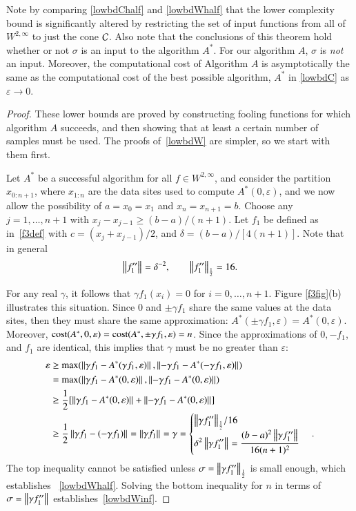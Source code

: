 \documentclass[review]{elsarticle}
\newcommand{\abstol}{\varepsilon}
\theoremstyle{definition}
\renewcommand{\cw}{W}
\begin{document}
Note by comparing \eqref{lowbdChalf} and \eqref{lowbdWhalf} that the lower complexity 
bound is significantly altered by restricting the
set of input functions from all of $ \cw^{2,\infty}$ to just the cone
$\cc$. Also note that the
conclusions of this theorem hold whether or not $\sigma$ is an input to the
algorithm $A^*$. For our algorithm $A$, $\sigma$ is \emph{not} an input. Moreover, the 
computational cost of Algorithm $A$ is asymptotically
the same as the computational cost of the best possible algorithm, $A^*$ in 
\eqref{lowbdC} as $\abstol \to 0$.

\begin{proof}
	These lower bounds are proved by constructing fooling functions for which
	algorithm $A$ succeeds, and then showing that at least a certain number of
	samples must be used. The proofs of~\eqref{lowbdW} are simpler, so
	we start with them first.
		
	Let $A^*$ be a successful algorithm for all $f \in \cw^{2,\infty}$, and consider
	the partition $x_{0:n+1}$, where $x_{1:n}$ are the data sites
	used to compute $A^*(0,\abstol)$, and we now allow the possibility of $a = x_0=x_1$ 
	and $x_n = x_{n+1} = b$. Choose any $j=1, \ldots, n+1$ with
	$x_j-x_{j-1} \ge (b-a)/(n+1)$. Let $f_1$ be defined as in~\eqref{f3def} with $c
	= (x_j+x_{j-1})/2$, and $\delta = (b-a)/[4(n+1)]$. Note that in general
	\begin{equation}
	\norm{f_1''} =  \delta^{-2}, \qquad \norm[\frac 12]{f_1''} = 16.
	\end{equation}

	For any real $\gamma$, it follows that $\gamma f_1(x_i)=0$ for $i=0, \ldots,
	n+1$. Figure \ref{f3fig}(b) illustrates this situation. Since $0$ and $\pm
	\gamma f_1$ share the same values at the data sites, then they must share the
	same approximation: $A^*(\pm \gamma f_1,\abstol) = A^*(0,\abstol)$. Moreover,
	$\cost(A^*,0,\abstol) = \cost(A^*,\pm \gamma f_1,\abstol) = n$. Since the
	approximations of $0, -f_1$, and $f_1$ are identical, this implies that $\gamma$
	must be no greater than $\abstol$:
	\begin{align*}
	\abstol  &\ge \max(\norm{\gamma f_1 - A^*(\gamma f_1,\abstol)}, 
	\norm{-\gamma f_1 - A^*(-\gamma f_1,\abstol)}) \\
	&= \max(\norm{\gamma f_1 - A^*(0,\abstol)}, \norm{-\gamma f_1 - A^*(0,\abstol)}) \\
	& \ge \frac{1}{2} [\norm{\gamma f_1 - A^*(0,\abstol)} 
	+ \norm{-\gamma f_1 - A^*(0,\abstol)}] \\
	& \ge \frac{1}{2} \norm{\gamma f_1 - (-\gamma f_1)} =  \norm{\gamma f_1} 
	= \gamma %
	= \begin{cases} \displaystyle { \norm[\frac 12]{\gamma f_1''}}/{16}  \\
	\displaystyle \delta^2 	\norm{\gamma f_1''} 
	=  \frac{(b-a)^2 \norm{\gamma f_1''}}{16(n+1)^2}
	\end{cases}.
	\end{align*}
	The top inequality cannot be satisfied unless $\sigma = \norm[\frac 12]{\gamma
	f_1''}$ is small enough, which establishes ~\eqref{lowbdWhalf}. Solving the
	bottom inequality for $n$ in terms of $\sigma = \norm{\gamma f_1''}$
	establishes~\eqref{lowbdWinf}.


\end{proof}
\end{document}
